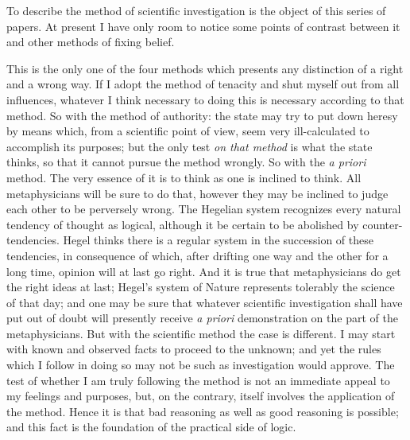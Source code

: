 To describe the method of scientific investigation is the object of
this series of papers. At present I have only room to notice some
points of contrast between it and other methods of fixing belief.

This is the only one of the four methods which presents any
distinction of a right and a wrong way. If I adopt the method of
tenacity and shut myself out from all influences, whatever I think
necessary to doing this is necessary according to that method. So with
the method of authority: the state may try to put down heresy by means
which, from a scientific point of view, seem very ill-calculated to
accomplish its purposes; but the only test \textit{on that method} is
what the state thinks, so that it cannot pursue the method wrongly. So
with the \textit{a priori} method. The very essence of it is to think
as one is inclined to think. All metaphysicians will be sure to do
that, however they may be inclined to judge each other to be
perversely wrong. The Hegelian system recognizes every natural
tendency of thought as logical, although it be certain to be abolished
by counter-tendencies. Hegel thinks there is a regular system in the
succession of these tendencies, in consequence of which, after
drifting one way and the other for a long time, opinion will at last
go right.  And it is true that metaphysicians do get the
right ideas at last; Hegel's system of Nature represents tolerably the
science of that day; and one may be sure that whatever scientific
investigation shall have put out of doubt will presently receive
\textit{a priori} demonstration on the part of the metaphysicians. But
with the scientific method the case is different. I may start with
known and observed facts to proceed to the unknown; and yet the rules
which I follow in doing so may not be such as investigation would
approve. The test of whether I am truly following the method is not
an immediate appeal to my feelings and purposes, but, on the contrary,
itself involves the application of the method. Hence it is that bad
reasoning as well as good reasoning is possible; and this fact is the
foundation of the practical side of logic.

